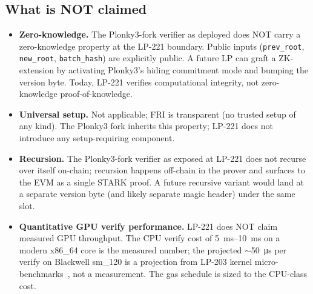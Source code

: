 \subsection{What is NOT claimed}

\begin{itemize}[leftmargin=2em,nosep]
\item \textbf{Zero-knowledge.} The Plonky3-fork verifier as deployed
  does NOT carry a zero-knowledge property at the LP-221 boundary.
  Public inputs (\texttt{prev\_root}, \texttt{new\_root},
  \texttt{batch\_hash}) are explicitly public. A future LP can
  graft a ZK-extension by activating Plonky3's hiding commitment
  mode and bumping the version byte. Today, LP-221 verifies
  computational integrity, not zero-knowledge proof-of-knowledge.
\item \textbf{Universal setup.} Not applicable; FRI is transparent
  (no trusted setup of any kind). The Plonky3 fork inherits this
  property; LP-221 does not introduce any setup-requiring
  component.
\item \textbf{Recursion.} The Plonky3-fork verifier as exposed at
  LP-221 does not recurse over itself on-chain; recursion happens
  off-chain in the prover and surfaces to the EVM as a single
  STARK proof. A future recursive variant would land at a separate
  version byte (and likely separate magic header) under the same
  slot.
\item \textbf{Quantitative GPU verify performance.} LP-221 does NOT
  claim measured GPU throughput. The CPU verify cost of
  \SIrange{5}{10}{\milli\second} on a modern x86\_64 core is the
  measured number; the projected $\sim$\SI{50}{\micro\second} per
  verify on Blackwell sm\_120 is a projection from LP-203 kernel
  micro-benchmarks~\cite{lp203}, not a measurement. The gas
  schedule is sized to the CPU-class cost.
\end{itemize}
